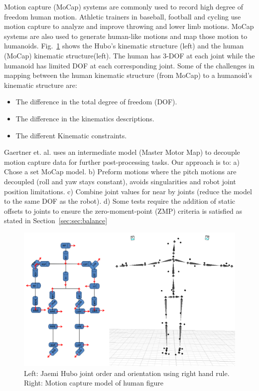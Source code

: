 Motion capture (MoCap) systems are commonly used to record high degree of freedom human motion.  
Athletic trainers in baseball, football and cycling use motion capture to analyze and improve throwing and lower limb motions\cite{Fleisig1996,barrentiine1998,Mochizuki1998,Akira1999}.
MoCap systems are also used to generate human-like motions and map those motion to humanoids\cite{1545060,Polland2002}.  
Fig.~\ref{fig:mocap-joints} shows the Hubo's kinematic structure (left) and the human (MoCap) kinematic structure(left).
The human has 3-DOF at each joint while the humanoid has limited DOF at each corresponding joint.
Some of the challenges in mapping between the human kinematic structure (from MoCap) to a humanoid's kinematic structure are:

\begin{itemize}
	\item The difference in the total degree of freedom (DOF). 
	\item	The difference in the kinematics descriptions. 
	\item	The different Kinematic constraints.
\end{itemize}

Gaertner et. al.\cite{5756898} uses an intermediate model (Master Motor Map) to decouple motion capture data for further post-processing tasks. 
Our approach is to: 
a) Chose a set MoCap model.  
b) Preform motions where the pitch motions are decoupled (roll and yaw stays constant), avoids singularities and robot joint position limitations.  
c) Combine joint values for near by joints (reduce the model to the same DOF as the robot).  
d) Some tests require the addition of static offsets to joints to ensure the zero-moment-point (ZMP) criteria is satisfied as stated in Section~\ref{sec:sec:balance}

\begin{figure}[thpb]
  \centering
\includegraphics[width=0.6\columnwidth]{./pix/mocapJoints.png}  \caption{Left: Jaemi Hubo joint order and orientation using right hand rule.  Right: Motion capture model of human figure}
  \label{fig:mocap-joints}
\end{figure}



